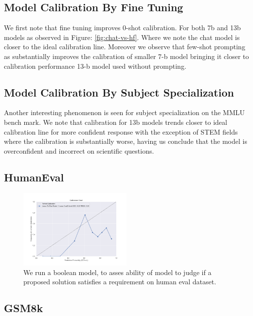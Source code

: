 \documentclass[11pt]{article}
\begin{document}
\subsection{Model Calibration By Fine Tuning}  

We first note that fine tuning improves 0-shot calibration. For both 7b and 13b models as observed in 
Figure: \ref{fig:chat-vs-hf}. Where we note the chat model is closer to the ideal calibration line. Moreover we observe that 
few-shot prompting as substantially improves the calibration of smaller 7-b model bringing it closer to calibration performance 13-b model used without prompting.


\subsection{Model Calibration By Subject Specialization}  

Another interesting phenomenon is seen for subject specialization on the MMLU bench mark. We note that calibration for 13b models  trends closer to ideal calibration line for more confident response with the exception of STEM fields where the calibration is substantially worse, having us conclude that the model 
is overconfident and incorrect on scientific questions.



\FloatBarrier

\subsection{HumanEval}

\begin{figure}
  \includegraphics[width=0.5\textwidth]{figures/0-shot-7b-human-eval.png}
  \caption{We run a boolean model, to asses ability of model to judge if a proposed solution satisfies a requirement on human eval dataset.}
  \label{fig:human-eval-results}
\end{figure}

\subsection{GSM8k}
\end{document}
